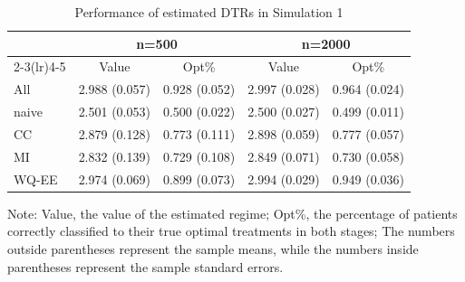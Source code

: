 \documentclass[12pt]{article}
\begin{document}
\begin{table}[htbp]
  \centering
  \caption{Performance of estimated DTRs in Simulation 1}
  \begin{threeparttable}
    \begin{tabular}{lcccc}
    \hline
          & \multicolumn{2}{c}{n=500}     & \multicolumn{2}{c}{n=2000} \\
          \cmidrule(lr){2-3}\cmidrule(lr){4-5}
          & Value & Opt\% & Value & Opt\% \\
          \hline
    All  & 2.988 (0.057) & 0.928 (0.052) & 2.997 (0.028) & 0.964 (0.024) \\
    naive & 2.501 (0.053) & 0.500 (0.022) & 2.500 (0.027) & 0.499 (0.011) \\
    CC    & 2.879 (0.128) & 0.773 (0.111) & 2.898 (0.059) & 0.777 (0.057)  \\
    MI    & 2.832 (0.139) & 0.729 (0.108) & 2.849 (0.071) & 0.730 (0.058) \\
    WQ-EE & 2.974 (0.069) & 0.899 (0.073) & 2.994 (0.029) & 0.949 (0.036) \\
    \hline
    \end{tabular}%
\begin{tablenotes}
    \small
    \item Note: Value, the value of the estimated regime; Opt\%, the percentage of patients correctly classified to their true optimal treatments in both stages; The numbers outside parentheses represent the sample means, while the numbers inside parentheses represent the sample standard errors.
\end{tablenotes}
  \end{threeparttable}
  \label{simutable1}%
\end{table}%


\end{document}
